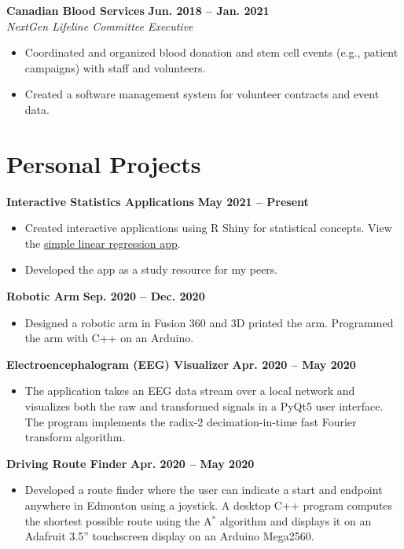 \documentclass{article}
\begin{document}
\textbf{Canadian Blood Services}  \hfill \textbf{Jun. 2018 -- Jan. 2021} \\
\textit{NextGen Lifeline Committee Executive}
\begin{itemize}
    \item Coordinated and organized blood donation and stem cell events (e.g., patient campaigns) with staff and volunteers.
    \item Created a software management system for volunteer contracts and event data.
\end{itemize}

\section*{\textcolor{my_colour}{Personal Projects}}
\vspace{-.25em} \hrulefill \vspace{.25em}

\textbf{Interactive Statistics Applications} \hfill \textbf{May 2021 -- Present}
\begin{itemize}
    \item Created interactive applications using R Shiny for statistical concepts. View the \href{https://intro-stats.shinyapps.io/slreg/}{simple linear regression app}.
    \item Developed the app as a study resource for my peers.
\end{itemize} \vspace{1em}

\textbf{Robotic Arm} \hfill \textbf{Sep. 2020 -- Dec. 2020}
\begin{itemize}
    \item Designed a robotic arm in Fusion 360 and 3D printed the arm. Programmed the arm with C++ on an Arduino.
\end{itemize} \vspace{1em}

\textbf{Electroencephalogram (EEG) Visualizer} \hfill \textbf{Apr. 2020 -- May 2020}
\begin{itemize}
    \item The application takes an EEG data stream over a local network and visualizes both the raw and transformed signals in a PyQt5 user interface. The program implements the radix-2 decimation-in-time fast Fourier transform algorithm.
\end{itemize} \vspace{1em}

\textbf{Driving Route Finder} \hfill \textbf{Apr. 2020 -- May 2020}
\begin{itemize}
    \item Developed a route finder where the user can indicate a start and endpoint anywhere in Edmonton using a joystick. A desktop C++ program computes the shortest possible route using the A$^*$ algorithm and displays it on an Adafruit 3.5'' touchscreen display on an Arduino Mega2560.
\end{itemize}
\end{document}
